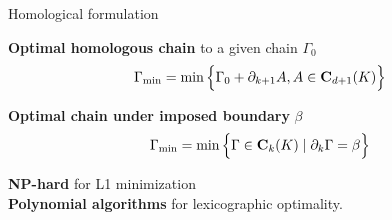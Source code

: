 \begin{frame}[t]{Homological formulation}
\small

\begin{minipage}{0.5\linewidth}
\textbf{Optimal homologous chain} to a given chain $\Gamma_0$
\begin{equation*}
	\Gamma_{\min} = \min \Big\{ \Gamma_0 + \partial_{k+1} A, A \in \mathbf{C}_{d+1}(K) \Big\}
\end{equation*}

\textbf{Optimal chain under imposed boundary} $\beta$
\begin{equation*}
	\Gamma_{\min} = \min \Big\{ \Gamma \in \mathbf{C}_k(K) \mid \partial_k \Gamma = \beta \Big\}
\end{equation*}

\end{minipage}%
\begin{minipage}{0.5\linewidth}
	
	
\end{minipage}

\pause
\vspace{0.5cm}
\textbf{NP-hard} for L1 minimization \cite{dey_ComputingMinimalPersistent_2020} \\
\pause
\textbf{Polynomial algorithms} for lexicographic optimality.
\end{frame}

%	
%	
%	
%	

